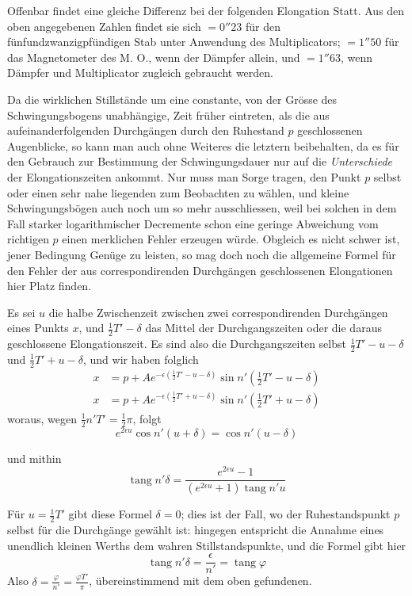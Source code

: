 Offenbar findet eine gleiche Differenz bei der folgenden Elongation Statt. Aus den oben angegebenen Zahlen findet sie sich $=0''23$ für den fünfundzwanzigpfündigen Stab unter Anwendung des Multiplicators; $=1''50$ für das Magnetometer des M. O., wenn der Dämpfer allein, und $=1''63$, wenn Dämpfer und Multiplicator zugleich gebraucht werden.

Da die wirklichen Stillstände um eine constante, von der Grösse des Schwingungsbogens unabhängige, Zeit früher eintreten, als die aus aufeinanderfolgenden Durchgängen durch den Ruhestand $p$ geschlossenen Augenblicke, so kann man auch ohne Weiteres die letztern beibehalten, da es für den Gebrauch zur Bestimmung der Schwingungsdauer nur auf die \textit{Unterschiede} der Elongationszeiten ankommt. Nur muss man Sorge tragen, den Punkt $p$ selbst oder einen sehr nahe liegenden zum Beobachten zu wählen, und kleine Schwingungsbögen auch noch um so mehr ausschliessen, weil bei solchen in dem Fall starker logarithmischer Decremente schon eine geringe Abweichung vom richtigen $p$ einen merklichen Fehler erzeugen würde. Obgleich es nicht schwer ist, jener Bedingung Genüge zu leisten, so mag doch noch die allgemeine Formel für den Fehler der aus correspondirenden Durchgängen geschlossenen Elongationen hier Platz finden.

Es sei $u$ die halbe Zwischenzeit zwischen zwei correspondirenden Durchgängen eines Punkts $x$, und $\tfrac12T'-\delta$ das Mittel der Durchgangszeiten oder die daraus geschlossene Elongationszeit. Es sind also die Durchgangszeiten selbst $\tfrac12T'-u-\delta$ und $\tfrac12T'+u-\delta$, und wir haben folglich
\[
\begin{aligned}
x&=p+Ae^{-\epsilon(\tfrac12T'-u-\delta)}\sin n'(\tfrac12T'-u-\delta)\\
x&=p+Ae^{-\epsilon(\tfrac12T'+u-\delta)}\sin n'(\tfrac12T'+u-\delta)
\end{aligned}
\]
woraus, wegen $\tfrac12n'T'=\tfrac12\pi$, folgt
\[
e^{2\epsilon u}\cos n'(u+\delta)=\cos n'(u-\delta)
\]
\par\clearpage
{}
\noindent und mithin
\[
\operatorname{tang}n'\delta=\frac{e^{2\epsilon u}-1}{(e^{2\epsilon u}+1)\operatorname{tang}n'u}
\]

Für $u=\tfrac12T'$ gibt diese Formel $\delta=0$; dies ist der Fall, wo der Ruhestandspunkt $p$ selbst für die Durchgänge gewählt ist: hingegen entspricht die Annahme eines unendlich kleinen Werths dem wahren Stillstandspunkte, und die Formel gibt hier
\[
\operatorname{tang}n'\delta=\frac{\epsilon}{n'}=\operatorname{tang}\varphi
\]
Also $\delta=\frac{\varphi}{n'}=\frac{\varphi T'}{\pi}$, übereinstimmend mit dem oben gefundenen.

